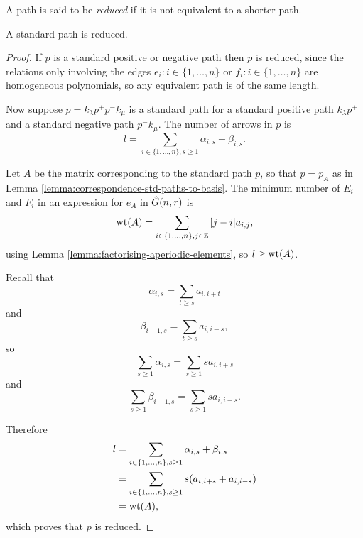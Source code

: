 \documentclass[a4paper, 11pt]{report}
\begin{document}
\begin{definition}\label{def:reduced-path}
A path is said to be \emph{reduced} if it is not equivalent to a shorter path.
\end{definition}

\begin{lemma}\label{lemma:standard-path-reduced}
A standard path is reduced.
\end{lemma}

\begin{proof}
If $p$ is a standard positive or negative path then $p$ is reduced, since the relations only involving the edges $e_i:i\in\{1,\ldots,n\}$ or $f_i:i\in\{1,\ldots,n\}$ are homogeneous polynomials, so any equivalent path is of the same length.

Now suppose $p=k_\lambda p^+p^- k_\mu$ is a standard path for a standard positive path $k_\lambda p^+$ and a standard negative path $p^- k_\mu$. The number of arrows in $p$ is
\begin{equation*}
l=\sum_{i\in\{1,\ldots,n\},s\geq 1} \alpha_{i,s} + \beta_{i,s}.
\end{equation*}

Let $A$ be the matrix corresponding to the standard path $p$, so that $p=p_A$ as in Lemma \ref{lemma:correspondence-std-paths-to-basis}. The minimum number of $E_i$ and $F_i$ in an expression for $e_A$ in $\hat{G}(n,r)$ is
\begin{equation*}
\operatorname{wt}(A) = \sum_{i\in\{1,\ldots,n\},j\in\mathbb{Z}} |j-i|a_{i,j},
\end{equation*}
using Lemma \ref{lemma:factorising-aperiodic-elements}, so $l\geq \operatorname{wt}(A)$.

Recall that
\begin{equation*}
\alpha_{i,s} = \sum_{t\geq s} a_{i,i+t}
\end{equation*}
and
\begin{equation*}
\beta_{i-1,s} = \sum_{t\geq s} a_{i,i-s},
\end{equation*}
so
\begin{equation*}
\sum_{s\geq 1} \alpha_{i,s} = \sum_{s\geq 1} sa_{i,i+s}
\end{equation*}
and
\begin{equation*}
\sum_{s\geq 1} \beta_{i-1,s} = \sum_{s\geq 1} sa_{i,i-s}.
\end{equation*}

Therefore
\begin{align*}
l &= \sum_{i\in\{1,\ldots,n\},s\geq 1} \alpha_{i,s} + \beta_{i,s}\\
&= \sum_{i\in\{1,\ldots,n\},s\geq 1} s(a_{i,i+s} + a_{i,i-s})\\
&= \operatorname{wt}(A),
\end{align*}
which proves that $p$ is reduced.
\end{proof}
\end{document}
